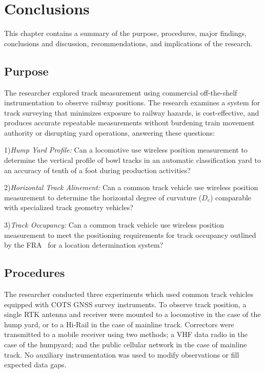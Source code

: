 \chapter{Conclusions}
This chapter contains a summary of the purpose, procedures, major findings, conclusions and discussion, recommendations, and implications of the research.

\section{Purpose}

The researcher explored track measurement using commercial off-the-shelf instrumentation to observe railway positions. The research examines a system for track surveying that minimizes exposure to railway hazards, is cost-effective, and produces accurate repeatable measurements without burdening train movement authority or disrupting yard operations, answering these questions:

1)\emph{Hump Yard Profile:}
Can a locomotive use wireless position measurement to determine the vertical profile of bowl tracks in an automatic classification yard to an accuracy of tenth of a foot during production activities?

2)\emph{Horizontal Track Alinement:}
Can a common track vehicle use wireless position measurement to determine the horizontal degree of curvature ($D_c$) comparable with specialized track geometry vehicles?

3)\emph{Track Occupancy:}
Can a common track vehicle use wireless position measurement to meet the positioning requirements for track occupancy outlined by the FRA~\citep[pp.6-7]{1995FRADiffe} for a location determination system?

\section{Procedures}

The researcher conducted three experiments which used common track vehicles equipped with COTS GNSS survey instruments. To observe track position, a single RTK antenna and receiver were mounted to a locomotive in the case of the hump yard, or to a Hi-Rail in the case of mainline track. Correctors were transmitted to a mobile receiver using two methods; a VHF data radio in the case of the humpyard; and the public cellular network in the case of mainline track. No auxiliary instrumentation was used to modify observations or fill expected data gaps.

